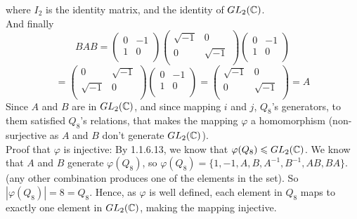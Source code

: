 \documentclass[12pt]{article}
\begin{document}
    where $I_2$ is the identity matrix,
    and the identity of $GL_2(\mathbb{C})$. \\
    And finally
    \[  BAB = \begin{pmatrix}
        0 & -1 \\
        1 & 0 \\
    \end{pmatrix}
    \begin{pmatrix}
        \sqrt{-1} & 0 \\
        0 & \sqrt{-1} \\
    \end{pmatrix}
    \begin{pmatrix}
        0 & -1 \\
        1 & 0 \\
    \end{pmatrix} \]
    \[ = \begin{pmatrix}
        0 & \sqrt{-1} \\
        \sqrt{-1} & 0 \\
    \end{pmatrix}
    \begin{pmatrix}
        0 & -1 \\
        1 & 0 \\
    \end{pmatrix}
    = \begin{pmatrix}
        \sqrt{-1} & 0 \\
        0 & \sqrt{-1} \\
    \end{pmatrix} = A \]
    Since $A$ and $B$ are in $GL_2(\mathbb{C})$,
    and since mapping $i$ and $j$, $Q_8$'s generators, to them
    satisfied $Q_8$'s relations,
    that makes the mapping $\varphi$ a homomorphism
    (non-surjective as $A$ and $B$ don't generate $GL_2(\mathbb{C})$). \\
    Proof that $\varphi$ is injective:
    By 1.1.6.13, we know that $\varphi(Q_8) \leqslant GL_2(\mathbb{C})$.
    We know that $A$ and $B$ generate $\varphi(Q_8)$,
    so $\varphi(Q_8) = \{ 1, -1, A, B, A^{-1}, B^{-1}, AB, BA \}$.
    (any other combination produces one of the elements in the set).
    So $|\varphi(Q_8)| = 8 = Q_8$.
    Hence, as $\varphi$ is well defined, each element in $Q_8$
    maps to exactly one element in $GL_2(\mathbb{C})$,
    making the mapping injective.
        
\end{document}
